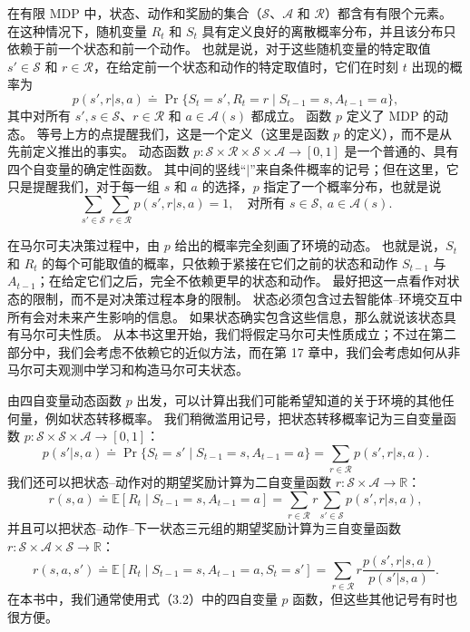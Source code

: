 \documentclass[UTF8, 12pt, fontset=fandol, oneside]{ctexart}
\begin{document}
在有限 MDP 中，状态、动作和奖励的集合（$\mathcal{S}$、$\mathcal{A}$ 和 $\mathcal{R}$）都含有有限个元素。
在这种情况下，随机变量 $R_t$ 和 $S_t$ 具有定义良好的离散概率分布，并且该分布只依赖于前一个状态和前一个动作。
也就是说，对于这些随机变量的特定取值 $s'\in\mathcal{S}$ 和 $r\in\mathcal{R}$，在给定前一个状态和动作的特定取值时，它们在时刻 $t$ 出现的概率为
\begin{equation}
p(s',r|s,a)\doteq \Pr\{S_t=s',R_t=r\mid S_{t-1}=s,A_{t-1}=a\},
\tag{3.2}
\end{equation}
其中对所有 $s',s\in\mathcal{S}$、$r\in\mathcal{R}$ 和 $a\in\mathcal{A}(s)$ 都成立。
函数 $p$ 定义了 MDP 的动态。
等号上方的点提醒我们，这是一个定义（这里是函数 $p$ 的定义），而不是从先前定义推出的事实。
动态函数 $p:\mathcal{S}\times\mathcal{R}\times\mathcal{S}\times\mathcal{A}\to[0,1]$ 是一个普通的、具有四个自变量的确定性函数。
其中间的竖线“$|$”来自条件概率的记号；但在这里，它只是提醒我们，对于每一组 $s$ 和 $a$ 的选择，$p$ 指定了一个概率分布，也就是说
\begin{equation}
\sum_{s'\in\mathcal{S}}\sum_{r\in\mathcal{R}}p(s',r|s,a)=1,\quad \text{对所有 }s\in\mathcal{S},\ a\in\mathcal{A}(s).
\tag{3.3}
\end{equation}

在马尔可夫决策过程中，由 $p$ 给出的概率完全刻画了环境的动态。
也就是说，$S_t$ 和 $R_t$ 的每个可能取值的概率，只依赖于紧接在它们之前的状态和动作 $S_{t-1}$ 与 $A_{t-1}$；在给定它们之后，完全不依赖更早的状态和动作。
最好把这一点看作对状态的限制，而不是对决策过程本身的限制。
状态必须包含过去智能体--环境交互中所有会对未来产生影响的信息。
如果状态确实包含这些信息，那么就说该状态具有马尔可夫性质。
从本书这里开始，我们将假定马尔可夫性质成立；不过在第二部分中，我们会考虑不依赖它的近似方法，而在第 17 章中，我们会考虑如何从非马尔可夫观测中学习和构造马尔可夫状态。

由四自变量动态函数 $p$ 出发，可以计算出我们可能希望知道的关于环境的其他任何量，例如状态转移概率。
我们稍微滥用记号，把状态转移概率记为三自变量函数 $p:\mathcal{S}\times\mathcal{S}\times\mathcal{A}\to[0,1]$：
\begin{equation}
p(s'|s,a)\doteq \Pr\{S_t=s'\mid S_{t-1}=s,A_{t-1}=a\}
=\sum_{r\in\mathcal{R}}p(s',r|s,a).
\tag{3.4}
\end{equation}
我们还可以把状态--动作对的期望奖励计算为二自变量函数 $r:\mathcal{S}\times\mathcal{A}\to\mathbb{R}$：
\begin{equation}
r(s,a)\doteq \mathbb{E}[R_t\mid S_{t-1}=s,A_{t-1}=a]
=\sum_{r\in\mathcal{R}}r\sum_{s'\in\mathcal{S}}p(s',r|s,a),
\tag{3.5}
\end{equation}
并且可以把状态--动作--下一状态三元组的期望奖励计算为三自变量函数 $r:\mathcal{S}\times\mathcal{A}\times\mathcal{S}\to\mathbb{R}$：
\begin{equation}
r(s,a,s')\doteq \mathbb{E}[R_t\mid S_{t-1}=s,A_{t-1}=a,S_t=s']
=\sum_{r\in\mathcal{R}}r\frac{p(s',r|s,a)}{p(s'|s,a)}.
\tag{3.6}
\end{equation}
在本书中，我们通常使用式（3.2）中的四自变量 $p$ 函数，但这些其他记号有时也很方便。
\end{document}
